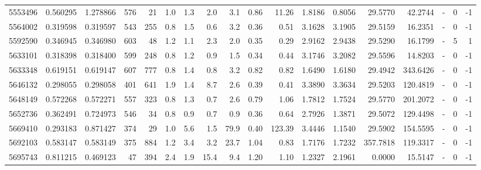 \begin{tabular}{rrrrrrrrrrrrrrrlrr}
   5553496 & 0.560295 &   1.278866 &  576 &   21 &      1.0 &      1.3 &     2.0 &      3.1 &       0.86 &       11.26 &  1.8186 &  0.8056 &   29.5770 &   42.2744 &             - &        0 &         -1 \\
   5564002 & 0.319598 &   0.319597 &  543 &  255 &      0.8 &      1.5 &     0.6 &      3.2 &       0.36 &        0.51 &  3.1628 &  3.1905 &   29.5159 &   16.2351 &             - &        0 &         -1 \\
   5592590 & 0.346945 &   0.346980 &  603 &   48 &      1.2 &      1.1 &     2.3 &      2.0 &       0.35 &        0.29 &  2.9162 &  2.9438 &   29.5290 &   16.1799 &             - &        5 &          1 \\
   5633101 & 0.318398 &   0.318400 &  599 &  248 &      0.8 &      1.2 &     0.9 &      1.5 &       0.34 &        0.44 &  3.1746 &  3.2082 &   29.5596 &   14.8203 &             - &        0 &         -1 \\
   5633348 & 0.619151 &   0.619147 &  607 &  777 &      0.8 &      1.4 &     0.8 &      3.2 &       0.82 &        0.82 &  1.6490 &  1.6180 &   29.4942 &  343.6426 &             - &        0 &         -1 \\
   5646132 & 0.298055 &   0.298058 &  401 &  641 &      1.9 &      1.4 &     8.7 &      2.6 &       0.39 &        0.41 &  3.3890 &  3.3634 &   29.5203 &  120.4819 &             - &        0 &         -1 \\
   5648149 & 0.572268 &   0.572271 &  557 &  323 &      0.8 &      1.3 &     0.7 &      2.6 &       0.79 &        1.06 &  1.7812 &  1.7524 &   29.5770 &  201.2072 &             - &        0 &         -1 \\
   5652736 & 0.362491 &   0.724973 &  546 &   34 &      0.8 &      0.9 &     0.7 &      0.9 &       0.36 &        0.64 &  2.7926 &  1.3871 &   29.5072 &  129.4498 &             - &        0 &         -1 \\
   5669410 & 0.293183 &   0.871427 &  374 &   29 &      1.0 &      5.6 &     1.5 &     79.9 &       0.40 &      123.39 &  3.4446 &  1.1540 &   29.5902 &  154.5595 &             - &        0 &         -1 \\
   5692103 & 0.583147 &   0.583149 &  375 &  884 &      1.2 &      3.4 &     3.2 &     23.7 &       1.04 &        0.83 &  1.7176 &  1.7232 &  357.7818 &  119.3317 &             - &        0 &         -1 \\
   5695743 & 0.811215 &   0.469123 &   47 &  394 &      2.4 &      1.9 &    15.4 &      9.4 &       1.20 &        1.10 &  1.2327 &  2.1961 &    0.0000 &   15.5147 &             - &        0 &         -1 \\

\end{tabular}
